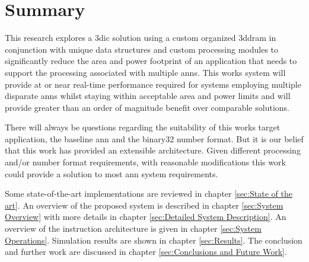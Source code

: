 \section[Summary]{Summary}
\label{sec:Summary}

This research explores a \ac{3dic} solution using a custom organized \ac{3ddram} in conjunction with unique data structures and custom processing modules to significantly reduce the 
area and power footprint of an application that needs to support the processing associated with multiple \ac{ann}s.
This works system will provide at or near real-time performance required for systems employing multiple disparate \ac{ann}s whilst staying within acceptable area and power limits and will provide greater than an order of magnitude benefit over comparable solutions.

There will always be questions regarding the suitability of this works target application, the baseline \ac{ann} and the \ac{binary32} number format.
But it is our belief that this work has provided an extensible architecture.
Given different processing and/or number format requirements, with reasonable modifications this work could provide a solution to most \ac{ann} system requirements.

\hfill %

\iffalse
An overview of \ac{3dic} technology is given in chapter \ref{sec:3dic}.
An overview on the pros and cons of \ac{dram} and \ac{sram} along with some proposed \ac{dram} customizations are given in chapter \ref{sec:DRAM Customizations}.
\fi
Some state-of-the-art implementations are reviewed in chapter \ref{sec:State of the art}.
An overview of the proposed system is described in chapter \ref{sec:System Overview} with more details in chapter \ref{sec:Detailed System Description}.
An overview of the instruction architecture is given in chapter \ref{sec:System Operations}.
Simulation results are shown in chapter \ref{sec:Results}.
The conclusion and further work are discussed in chapter \ref{sec:Conclusions and Future Work}.
